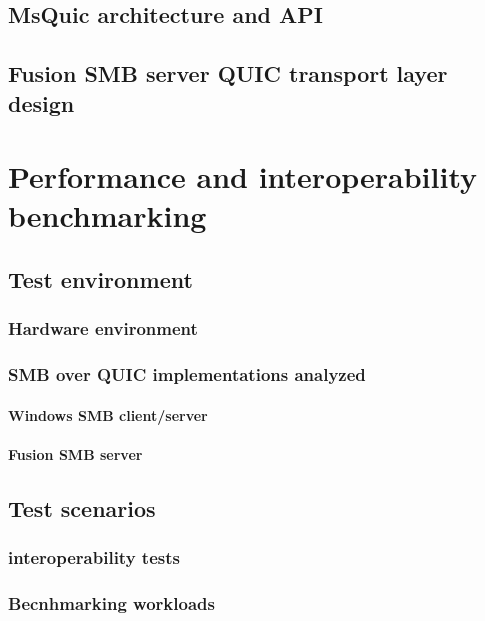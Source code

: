 \documentclass[english, 12pt, a4paper, elec, utf8, a-2b, online]{aaltothesis}
\begin{document}
\subsection{MsQuic architecture and API}

\subsection{Fusion SMB server QUIC transport layer design}
\clearpage
\section{Performance and interoperability benchmarking}

\subsection{Test environment}

\subsubsection{Hardware environment}

\subsubsection{SMB over QUIC implementations analyzed}

\paragraph{Windows SMB client/server}

\paragraph{Fusion SMB server}

\subsection{Test scenarios}

\subsubsection{interoperability tests}

\subsubsection{Becnhmarking workloads}
\end{document}
